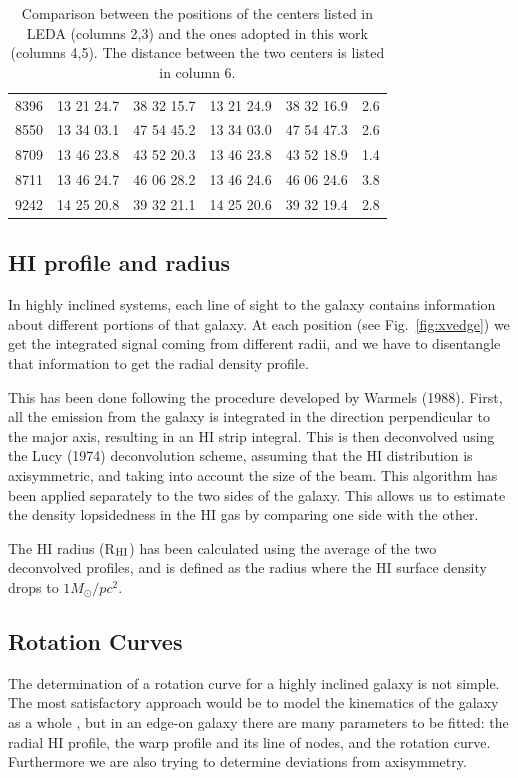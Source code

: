 \documentclass{aa}
\begin{document}
\begin{center}
\begin{table}
\begin{center}
\begin{tabular}{cccccc}
8396 & 13 21 24.7 & 38 32 15.7 & 13 21 24.9 & 38 32 16.9 & 2.6  \\
8550 & 13 34 03.1 & 47 54 45.2 & 13 34 03.0 & 47 54 47.3 & 2.6  \\
8709 & 13 46 23.8 & 43 52 20.3 & 13 46 23.8 & 43 52 18.9 & 1.4  \\
8711 & 13 46 24.7 & 46 06 28.2 & 13 46 24.6 & 46 06 24.6 & 3.8  \\
9242 & 14 25 20.8 & 39 32 21.1 & 14 25 20.6 & 39 32 19.4 & 2.8  \\
\hline
\end{tabular}
\caption{Comparison between the positions of the centers listed in
  LEDA (columns 2,3) and the ones adopted in this work (columns
  4,5). The distance between the two centers is listed in column 6.} 
\label{tab:koencen}
\end{center}
\end{table}
\end{center}

\subsection{HI profile and radius}
\label{hiprof}

In highly inclined systems, each line of sight to the galaxy contains
information about different portions of that galaxy. At each position
(see Fig.~\ref{fig:xvedge}) we get the
integrated signal coming from different radii, and we have to 
disentangle that information to get the radial density
profile. 

This has been done following the procedure developed by Warmels
(1988). First, all the emission from the galaxy is
integrated in the direction perpendicular to the major axis, resulting in
an HI strip integral. This is then deconvolved using the Lucy
(1974) deconvolution scheme, assuming that the HI
distribution is axisymmetric, and taking into account the size of the
beam. This algorithm has been applied separately to the two sides of the
galaxy. This allows us to estimate the density lopsidedness in the HI
gas by comparing one side with the other.

The HI radius (R$_{\rm HI}$) has been calculated using the average of the
two deconvolved profiles, and is defined as the radius where the HI surface density
drops to $1 M_{\odot}/pc^2$.

\subsection{Rotation Curves}
\label{rc}
The determination of a rotation curve for a highly inclined galaxy is
not simple. The most satisfactory approach would be to model the
kinematics of the galaxy as a whole \cite{rob}, but in an edge-on galaxy there
are many parameters to be fitted: the radial HI profile, the warp
profile and its line of nodes, and the rotation curve. Furthermore we are
also trying to determine deviations from axisymmetry. 
\end{document}

